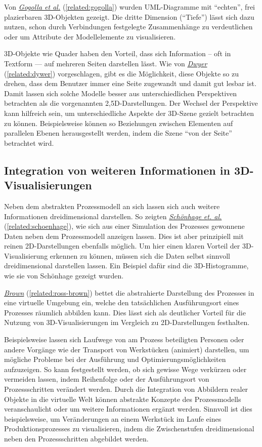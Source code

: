 \documentclass[a4paper,10pt]{sphinxmanual}
\begin{document}
Von {\hyperref[related:gogolla]{\emph{Gogolla et al.}}} (\autoref*{related:gogolla}) wurden UML-Diagramme mit "`echten"', frei plazierbaren 3D-Objekten gezeigt.
Die dritte Dimension ("`Tiefe"') lässt sich dazu nutzen, schon durch Verbindungen festgelegte Zusammenhänge zu verdeutlichen oder um Attribute der Modellelemente zu visualisieren.

3D-Objekte wie Quader haben den Vorteil, dass sich Information – oft in Textform — auf mehreren Seiten darstellen lässt.
Wie von {\hyperref[related:dywer]{\emph{Dwyer}}} (\autoref*{related:dywer}) vorgeschlagen, gibt es die Möglichkeit, diese Objekte so zu drehen, dass dem Benutzer immer eine Seite zugewandt und damit gut lesbar ist.
Damit lassen sich solche Modelle besser aus unterschiedlichen Perspektiven betrachten als die vorgenannten 2,5D-Darstellungen.
Der Wechsel der Perspektive kann hilfreich sein, um unterschiedliche Aspekte der 3D-Szene gezielt betrachten zu können.
Beispielsweise können so Beziehungen zwischen Elementen auf parallelen Ebenen herausgestellt werden, indem die Szene "`von der Seite"' betrachtet wird.


\subsection{Integration von weiteren Informationen in 3D-Visualisierungen}
\label{related:informations-integration}\label{related:integration-von-weiteren-informationen-in-3d-visualisierungen}
Neben dem abstrakten Prozessmodell an sich lassen sich auch weitere Informationen dreidimensional darstellen.
So zeigten {\hyperref[related:schoenhage]{\emph{Schönhage et. al.}}} (\autoref*{related:schoenhage}), wie sich aus einer Simulation des Prozesses gewonnene Daten neben dem Prozessmodell anzeigen lassen.
Dies ist aber prinzipiell mit reinen 2D-Darstellungen ebenfalls möglich.
Um hier einen klaren Vorteil der 3D-Visualisierung erkennen zu können, müssen sich die Daten selbst sinnvoll dreidimensional darstellen lassen.
Ein Beispiel dafür sind die 3D-Histogramme, wie sie von Schönhage gezeigt wurden.

{\hyperref[related:ross-brown]{\emph{Brown}}} (\autoref*{related:ross-brown}) bettet die abstrahierte Darstellung des Prozesses in eine virtuelle Umgebung ein, welche den tatsächlichen Ausführungsort eines Prozesses räumlich abbilden kann.
Dies lässt sich als deutlicher Vorteil für die Nutzung von 3D-Visualisierungen im Vergleich zu 2D-Darstellungen festhalten.

Beispielsweise lassen sich Laufwege von am Prozess beteiligten Personen oder andere Vorgänge wie der Transport von Werkstücken (animiert) darstellen, um mögliche Probleme bei der Ausführung und Optimierungsmöglichkeiten aufzuzeigen.
So kann festgestellt werden, ob sich gewisse Wege verkürzen oder vermeiden lassen, indem Reihenfolge oder der Ausführungsort von Prozessschritten verändert werden.
Durch die Integration von Abbildern realer Objekte in die virtuelle Welt können abstrakte Konzepte des Prozessmodells veranschaulicht oder um weitere Informationen ergänzt werden.
Sinnvoll ist dies beispielsweise, um Veränderungen an einem Werkstück im Laufe eines Produktionsprozesses zu visualisieren, indem die Zwischenstufen dreidimensional neben den Prozessschritten abgebildet werden.
\end{document}
